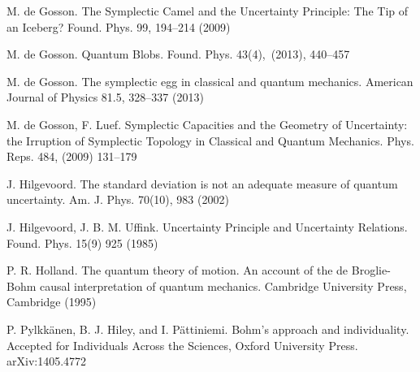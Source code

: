 \documentclass[12pt]{article}%
\begin{document}
\begin{thebibliography}{99}
M. de Gosson. The Symplectic Camel and the Uncertainty
Principle: The Tip of an Iceberg? Found. Phys. 99, 194--214 (2009)

M. de Gosson. Quantum Blobs. Found. Phys. 43(4),\ (2013), 440--457

M. de Gosson. The symplectic egg in classical and quantum
mechanics. American Journal of Physics 81.5, 328--337 (2013)

M. de Gosson, F. Luef. Symplectic Capacities and the Geometry
of Uncertainty: the Irruption of Symplectic Topology in Classical and Quantum
Mechanics. Phys. Reps. 484, (2009) 131--179

J. Hilgevoord. The standard deviation is not an adequate
measure of quantum uncertainty. Am. J. Phys. 70(10), 983 (2002)

J. Hilgevoord, J. B. M. Uffink. Uncertainty Principle and
Uncertainty Relations. Found. Phys. 15(9) 925 (1985)

P. R. Holland. The quantum theory of motion. An account of
the de Broglie-Bohm causal interpretation of quantum mechanics. Cambridge
University Press, Cambridge (1995)

P. Pylkk\"{a}nen, B. J. Hiley, and I. P\"{a}ttiniemi.
Bohm's approach and individuality. Accepted for Individuals Across the
Sciences, Oxford University Press. arXiv:1405.4772
\end{thebibliography}
\end{document}
